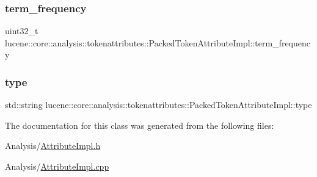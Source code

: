 \subsubsection{\texorpdfstring{term\+\_\+frequency}{term\_frequency}}
{\footnotesize\ttfamily uint32\+\_\+t lucene\+::core\+::analysis\+::tokenattributes\+::\+Packed\+Token\+Attribute\+Impl\+::term\+\_\+frequency\hspace{0.3cm}{\ttfamily [private]}}

\mbox{\label{classlucene_1_1core_1_1analysis_1_1tokenattributes_1_1PackedTokenAttributeImpl_a39f37a016d846f19589fda8383489164}} 
\subsubsection{\texorpdfstring{type}{type}}
{\footnotesize\ttfamily std\+::string lucene\+::core\+::analysis\+::tokenattributes\+::\+Packed\+Token\+Attribute\+Impl\+::type\hspace{0.3cm}{\ttfamily [private]}}



The documentation for this class was generated from the following files\+:\begin{DoxyCompactItemize}
\item 
Analysis/\mbox{\hyperlink{AttributeImpl_8h}{Attribute\+Impl.\+h}}\item 
Analysis/\mbox{\hyperlink{AttributeImpl_8cpp}{Attribute\+Impl.\+cpp}}\end{DoxyCompactItemize}
